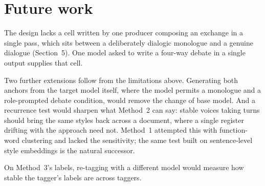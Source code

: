 \documentclass[10pt,twocolumn]{article}
\begin{document}
\section{Future work}
The design lacks a cell written by one producer composing an exchange in a single pass, which sits
between a deliberately dialogic monologue and a genuine dialogue (Section~5). One model asked to
write a four-way debate in a single output supplies that cell.

Two further extensions follow from the limitations above. Generating both anchors from the target
model itself, where the model permits a monologue and a role-prompted debate condition, would remove
the change of base model. And a recurrence test would sharpen what Method~2 can say: stable voices
taking turns should bring the same styles back across a document, where a single register drifting
with the approach need not. Method~1 attempted this with function-word clustering and lacked the
sensitivity; the same test built on sentence-level style embeddings is the natural successor.

On Method~3's labels, re-tagging with a different model would measure how stable the tagger's labels
are across taggers.
\end{document}
